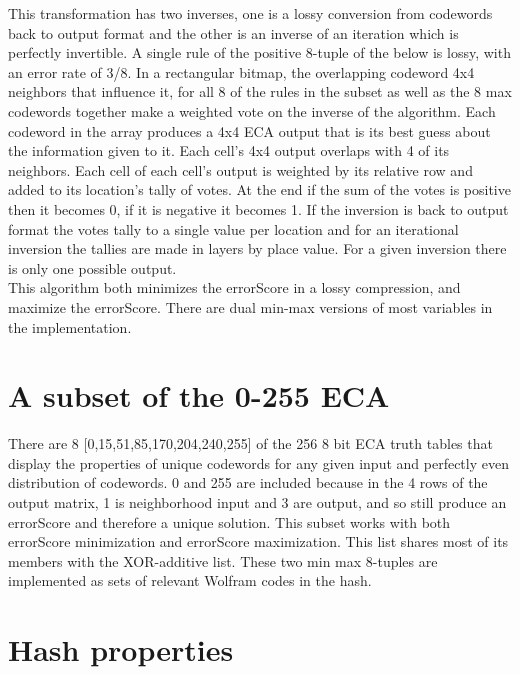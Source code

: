 \documentclass[11pt]{article}
\begin{document}
This transformation has two inverses, one is a lossy conversion from codewords back to output format and the other is an inverse of an iteration which is perfectly invertible. A single rule of the positive 8-tuple of the below is lossy, with an error rate of 3/8. In a rectangular bitmap, the overlapping codeword 4x4 neighbors that influence it, for all 8 of the rules in the subset as well as the 8 max codewords together make a weighted vote on the inverse of the algorithm. Each codeword in the array produces a 4x4 ECA output that is its best guess about the information given to it. Each cell's 4x4 output overlaps with 4 of its neighbors. Each cell of each cell's output is weighted by its relative row and added to its location's tally of votes. At the end if the sum of the votes is positive then it becomes 0, if it is negative it becomes 1. If the inversion is back to output format the votes tally to a single value per location and for an iterational inversion the tallies are made in layers by place value. For a given inversion there is only one possible output.\\

This algorithm both minimizes the errorScore in a lossy compression, and maximize the errorScore. There are dual min-max versions of most variables in the implementation. \\

\section{A subset of the 0-255 ECA}

There are 8 [0,15,51,85,170,204,240,255] of the 256 8 bit ECA truth tables that display the properties of unique codewords for any given input and perfectly even distribution of codewords. 0 and 255 are included because in the 4 rows of the output matrix, 1 is neighborhood input and 3 are output, and so still produce an errorScore and therefore a unique solution. This subset works with both errorScore minimization and errorScore maximization. This list shares most of its members with the XOR-additive list. \cite{xorAdditive} These two min max 8-tuples are implemented as sets of relevant Wolfram codes in the hash.\\

\section{Hash properties}
\end{document}
